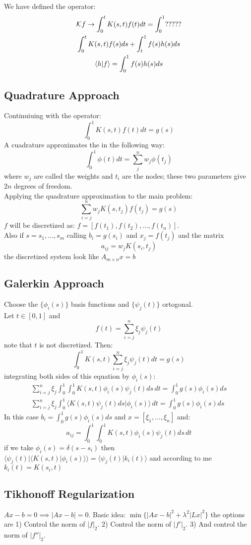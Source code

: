 We have defined the operator:
\begin{gather*}
\mathbf{\mathcal{K}} f\to \int_0^t K(s,t)f(t) dt = \int_0^1 ?????\\
\int_0^t K(s,t) f(s)ds + \int_t^1 f(s)h(s)ds \\
\langle h | f \rangle = \int_0^1 f(s)h(s)ds
\end{gather*}

\subsection{Quadrature Approach}
Continuiuing with the operator:
$$\int_0^1 K(s,t)f(t) dt = g(s)$$
A cuadrature approximates the in the following way:
$$\int_0^1 \phi(t)dt = \sum_j^n w_j \phi(t_j)$$
where $w_j$ are called the weights and $t_i$ are the nodes; these two parameters give $2n$ degrees of freedom.\\
Applying the quadrature approximation to the main problem:
$$ \sum_{i=j}^n w_j K(s,t_j)f(t_j) = g(s)$$
$f$ will be discretized as: $f=[f(t_1),f(t_2),\ldots,f(t_n)]$.\\
Also if $s=s_1,\ldots,s_m$ calling $b_i=g(s_i)$ and $x_j=f(t_j)$ and the matrix $$a_{ij}= w_j K(s_i,t_j)$$ the discretized system look like $A_{m\times n}x=b$
\subsection{Galerkin Approach}
Choose the $\{\phi_i(s)\}$ basis functions and $\{\psi_j(t)\}$ ortogonal.\\
Let $t\in [0,1]$ and $$f(t) = \sum_{i=j}^n \xi_j\psi_j(t)$$ note that $t$ is not discretized. Then:
$$\int_0^1 K(s,t)\sum_{i=j}^n \xi_j\psi_j(t)dt=g(s)$$
integrating both sides of this equation by $\phi_i(s)$:
\begin{gather*}
\sum_{i=j}^n \xi_j \int_0^1\int_0^1 K(s,t) \phi_i(s) \psi_j(t)ds\, dt= \int_0^1 g(s)\phi_i(s)ds\\
\sum_{i=j}^n \xi_j \int_0^1\langle  K(s,t)\psi_j(t)ds| \phi_i(s) \rangle \, dt= \int_0^1 g(s)\phi_i(s)ds
\end{gather*}
In this case $b_i=\int_0^1 g(s)\phi_i(s)ds$ and $x=[\xi_1,\ldots,\xi_n]$ and:
$$a_{ij} = \int_0^1\int_0^1 K(s,t) \phi_i(s) \psi_j(t)ds\, dt$$
if we take $\phi_i(s)=\delta(s-s_i)$ then $\langle \psi_j(t) | \langle K(s,t)|\phi_i(s)\rangle \rangle = \langle\psi_j(t) | k_i(t)\rangle$ and according to me $k_i(t)=K(s_i,t)$

\subsection{Tikhonoff Regularization}
$Ax-b=0\implies |Ax-b|=0$. Basic idea: $\min\{|Ax-b|^2 + \lambda^2 |Lx|^2 \}$ the options are 1) Control the norm of $|f|_2$. 2) Control the norm of $|f'|_2$. 3) And control the norm of $|f''|_2$.\\



